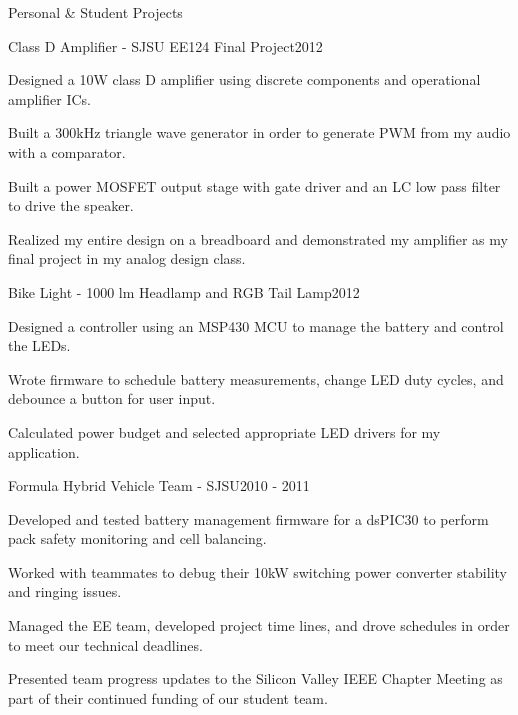 \documentclass{resume} %
\begin{document}
\pagebreak[3]
\begin{rSection}{Personal \& Student Projects}

\begin{rProject}{Class D Amplifier - SJSU EE124 Final Project}{2012}
\item Designed a 10W class D amplifier using discrete components and operational amplifier ICs.
\item Built a 300kHz triangle wave generator in order to generate PWM from my audio with a comparator.
\item Built a power MOSFET output stage with gate driver and an LC low pass filter to drive the speaker.
\item Realized my entire design on a breadboard and demonstrated my amplifier as my final project in my analog design class.
\end{rProject}

\begin{rProject}{Bike Light - 1000 lm Headlamp and RGB Tail Lamp}{2012}
\item Designed a controller using an MSP430 MCU to manage the battery and control the LEDs.
\item Wrote firmware to schedule battery measurements, change LED duty cycles, and debounce a button for user input. 
\item Calculated power budget and selected appropriate LED drivers for my application.
\end{rProject}

\begin{rProject}{Formula Hybrid Vehicle Team - SJSU}{2010 - 2011}
\item Developed and tested battery management firmware for a dsPIC30 to perform pack safety monitoring and cell balancing.
\item Worked with teammates to debug their 10kW switching power converter stability and ringing issues.
\item Managed the EE team, developed project time lines, and drove schedules in order to meet our technical deadlines.
\item Presented team progress updates to the Silicon Valley IEEE Chapter Meeting as part of their continued funding of our student team.
\end{rProject}
\end{rSection}
\end{document}
